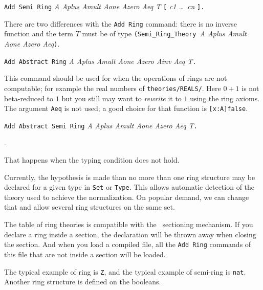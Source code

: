 \begin{Variants}
\item \texttt{Add Semi Ring} \textit{A Aplus Amult Aone Azero Aeq T} 
  \texttt{[} \textit{c1 \dots\ cn} \texttt{].}
  
  There are two differences with the \texttt{Add Ring} command: there
  is no inverse function and the term $T$ must be of type
  \texttt{(Semi\_Ring\_Theory }\textit{A Aplus Amult Aone Azero
    Aeq}\texttt{)}.

\item \texttt{Add Abstract Ring} \textit{A Aplus Amult Aone Azero Ainv 
    Aeq T}\texttt{.}
  
  This command should be used for when the operations of rings are not
  computable; for example the real numbers of
  \texttt{theories/REALS/}. Here $0+1$ is not beta-reduced to $1$ but
  you still may want to \textit{rewrite} it to $1$ using the ring
  axioms. The argument \texttt{Aeq} is not used; a good choice for
  that function is \verb+[x:A]false+.

\item \texttt{Add Abstract Semi Ring} \textit{A Aplus Amult Aone Azero
    Aeq T}\texttt{.}

\end{Variants}

\begin{ErrMsgs}
\item {}.
 
  That happens when the typing condition does not hold.
\end{ErrMsgs}

Currently, the hypothesis is made than no more than one ring structure
may be declared for a given type in \texttt{Set} or \texttt{Type}.
This allows automatic detection of the theory used to achieve the
normalization. On popular demand, we can change that and allow several
ring structures on the same set.

The table of ring theories is compatible with the \Coq\ 
sectioning mechanism. If you declare a ring inside a section, the
declaration will be thrown away when closing the section.
And when you load a compiled file, all the \texttt{Add Ring}
commands of this file that are not inside a section will be loaded.

The typical example of ring is \texttt{Z}, and the typical example of
semi-ring is \texttt{nat}. Another ring structure is defined on the
booleans. 

